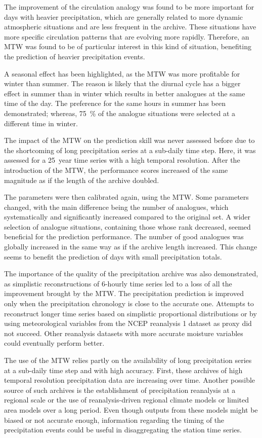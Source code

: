 \documentclass[hess, manuscript]{copernicus}
\begin{document}
	The improvement of the circulation analogy was found to be more important for days with heavier precipitation, which are generally related to more dynamic atmospheric situations and are less frequent in the archive. These situations have more specific circulation patterns that are evolving more rapidly. Therefore, an MTW was found to be of particular interest in this kind of situation, benefiting the prediction of heavier precipitation events.
	
	A seasonal effect has been highlighted, as the MTW was more profitable for winter than summer. The reason is likely that the diurnal cycle has a bigger effect in summer than in winter which results in better analogues at the same time of the day. The preference for the same hours in summer has been demonstrated; whereas, 75~\% of the analogue situations were selected at a different time in winter.
	
	The impact of the MTW on the prediction skill was never assessed before due to the shortcoming of long precipitation series at a sub-daily time step. Here, it was assessed for a 25~year time series with a high temporal resolution. After the introduction of the MTW, the performance scores increased of the same magnitude as if the length of the archive doubled.
	
	The parameters were then calibrated again, using the MTW. Some parameters changed, with the main difference being the number of analogues, which systematically and significantly increased compared to the original set. A wider selection of analogue situations, containing those whose rank decreased, seemed beneficial for the prediction performance. The number of good analogues was globally increased in the same way as if the archive length increased. This change seems to benefit the prediction of days with small precipitation totals.
	
	The importance of the quality of the precipitation archive was also demonstrated, as simplistic reconstructions of 6-hourly time series led to a loss of all the improvement brought by the MTW. The precipitation prediction is improved only when the precipitation chronology is close to the accurate one. Attempts to reconstruct longer time series based on simplistic proportional distributions or by using meteorological variables from the NCEP reanalysis 1 dataset as proxy did not succeed. Other reanalysis datasets with more accurate moisture variables could eventually perform better.
	
	The use of the MTW relies partly on the availability of long precipitation series at a sub-daily time step and with high accuracy. First, these archives of high temporal resolution precipitation data are increasing over time. Another possible source of such archives is the establishment of precipitation reanalysis at a regional scale or the use of reanalysis-driven regional climate models or limited area models over a long period. Even though outputs from these models might be biased or not accurate enough, information regarding the timing of the precipitation events could be useful in disaggregating the station time series.
	
\end{document}
